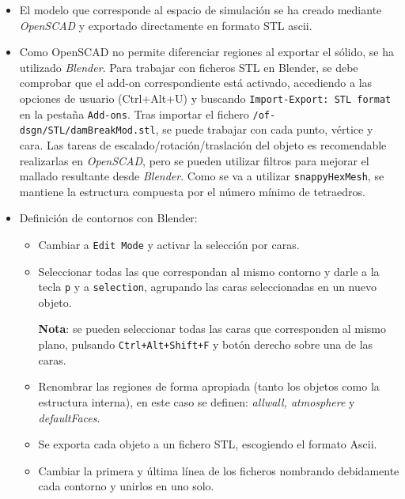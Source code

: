 \begin{itemize}
  \begin{itemize}
  \item
    El modelo que corresponde al espacio de simulación se ha creado
    mediante \emph{OpenSCAD} y exportado directamente en formato STL
    ascii.
  \item
    Como OpenSCAD no permite diferenciar regiones al exportar el sólido,
    se ha utilizado \emph{Blender}. Para trabajar con ficheros STL en
    Blender, se debe comprobar que el add-on correspondiente está
    activado, accediendo a las opciones de usuario (Ctrl+Alt+U) y
    buscando \texttt{Import-Export:\ STL\ format} en la pestaña
    \texttt{Add-ons}. Tras importar el fichero
    \lstinline[style=bash]{/of-dsgn/STL/damBreakMod.stl}, se puede trabajar con cada
    punto, vértice y cara. Las tareas de escalado/rotación/traslación
    del objeto es recomendable realizarlas en \emph{OpenSCAD}, pero se
    pueden utilizar filtros para mejorar el mallado resultante desde
    \emph{Blender}. Como se va a utilizar \texttt{snappyHexMesh}, se
    mantiene la estructura compuesta por el número mínimo de tetraedros.
  \end{itemize}
\end{itemize}

\begin{itemize}
\item
  Definición de contornos con Blender:

  \begin{itemize}
  \item
    Cambiar a \texttt{Edit\ Mode} y activar la selección por caras.
  \item
    Seleccionar todas las que correspondan al mismo contorno y darle a
    la tecla \texttt{p} y a \texttt{selection}, agrupando las caras
    seleccionadas en un nuevo objeto.

    \textbf{Nota}: se pueden seleccionar todas las caras que
    corresponden al mismo plano, pulsando \texttt{Ctrl+Alt+Shift+F} y
    botón derecho sobre una de las caras.
  \item
    Renombrar las regiones de forma apropiada (tanto los objetos como la
    estructura interna), en este caso se definen: \emph{allwall,
    atmosphere} y \emph{defaultFaces}.
  \item
    Se exporta cada objeto a un fichero STL, escogiendo el formato
    Ascii.
  \item
    Cambiar la primera y última línea de los ficheros nombrando
    debidamente cada contorno y unirlos en uno solo.
  \end{itemize}
\end{itemize}

